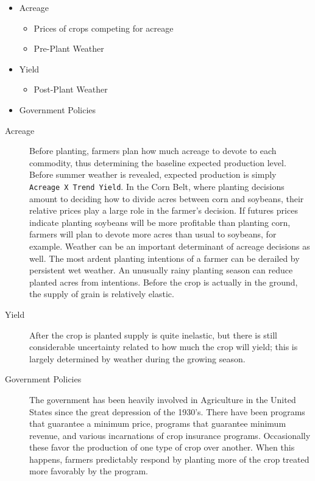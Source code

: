 \documentclass[]{book}
\providecommand{\tightlist}{%
  \setlength{\itemsep}{0pt}\setlength{\parskip}{0pt}}
\theoremstyle{definition}
\theoremstyle{definition}
\theoremstyle{remark}
\begin{document}
\begin{itemize}
\tightlist
\item
  Acreage

  \begin{itemize}
  \tightlist
  \item
    Prices of crops competing for acreage
  \item
    Pre-Plant Weather
  \end{itemize}
\item
  Yield

  \begin{itemize}
  \tightlist
  \item
    Post-Plant Weather
  \end{itemize}
\item
  Government Policies
\end{itemize}

\begin{description}
\item[Acreage]
Before planting, farmers plan how much acreage to devote to each
commodity, thus determining the baseline expected production level.
Before summer weather is revealed, expected production is simply
\texttt{Acreage\ X\ Trend\ Yield}. In the Corn Belt, where planting
decisions amount to deciding how to divide acres between corn and
soybeans, their relative prices play a large role in the farmer's
decision. If futures prices indicate planting soybeans will be more
profitable than planting corn, farmers will plan to devote more acres
than usual to soybeans, for example. Weather can be an important
determinant of acreage decisions as well. The most ardent planting
intentions of a farmer can be derailed by persistent wet weather. An
unusually rainy planting season can reduce planted acres from
intentions. Before the crop is actually in the ground, the supply of
grain is relatively elastic.
\item[Yield]
After the crop is planted supply is quite inelastic, but there is still
considerable uncertainty related to how much the crop will yield; this
is largely determined by weather during the growing season.
\item[Government Policies]
The government has been heavily involved in Agriculture in the United
States since the great depression of the 1930's. There have been
programs that guarantee a minimum price, programs that guarantee minimum
revenue, and various incarnations of crop insurance programs.
Occasionally these favor the production of one type of crop over
another. When this happens, farmers predictably respond by planting more
of the crop treated more favorably by the program.
\end{description}
\end{document}
